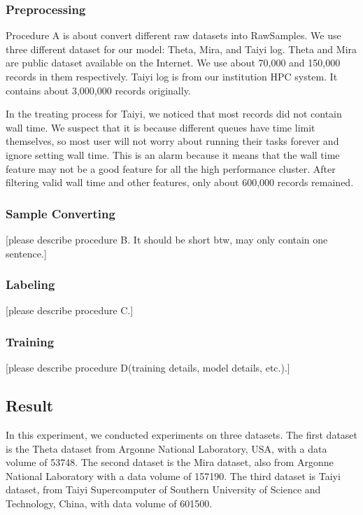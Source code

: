 \documentclass[conference,compsoc]{IEEEtran}
\begin{document}
\subsubsection{Preprocessing}
Procedure A is about convert different raw datasets into RawSamples. We use three different dataset for our model: Theta, Mira, and Taiyi log. Theta and Mira are public dataset available on the Internet. We use about 70,000 and 150,000 records in them respectively. Taiyi log is from our institution HPC system. It contains about 3,000,000 records originally.

In the treating process for Taiyi, we noticed that most records did not contain wall time. We suspect that it is because different queues have time limit themselves, so most user will not worry about running their tasks forever and ignore setting wall time. This is an alarm because it means that the wall time feature may not be a good feature for all the high performance cluster. After filtering valid wall time and other features, only about 600,000 records remained.

\subsubsection{Sample Converting}
[please describe procedure B. It should be short btw, may only contain one sentence.]

\subsubsection{Labeling}
[please describe procedure C.]

\subsubsection{Training}
[please describe procedure D(training details, model details, etc.).]

\subsection{Result}
In this experiment, we conducted experiments on three datasets. The first dataset is the Theta dataset from Argonne National Laboratory, USA, with a data volume of 53748. The second dataset is the Mira dataset, also from Argonne National Laboratory with a data volume of 157190. The third dataset is Taiyi dataset, from Taiyi Supercomputer of Southern University of Science and Technology, China, with data volume of 601500.
\end{document}
